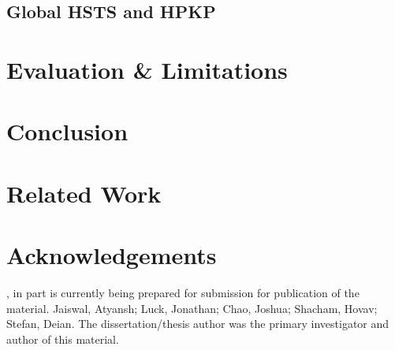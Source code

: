 \subsection{Global HSTS and HPKP}


\section{Evaluation \& Limitations}
\label{sec:evaluation-saber}

\section{Conclusion}
\label{sec:conclusion-saber}

\section{Related Work}
\label{sec:related-saber}

\section{Acknowledgements}
\label{sec:acknowledgement-saber}
, in part is currently being prepared for submission for
publication of the material. Jaiswal, Atyansh; Luck, Jonathan; Chao, Joshua;
Shacham, Hovav; Stefan, Deian. The dissertation/thesis author was the primary
investigator and author of this material.
